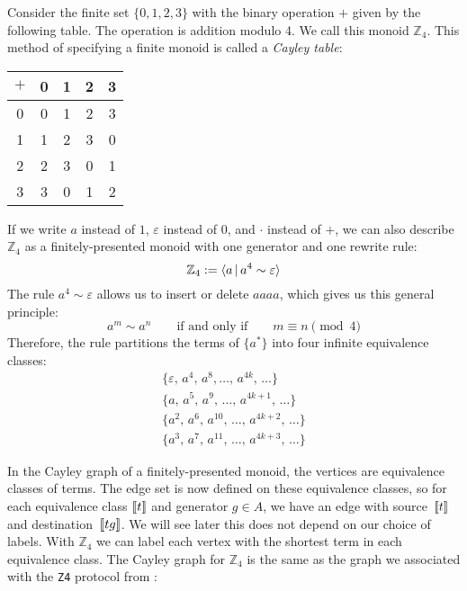 \documentclass[../generics]{subfiles}
\begin{document}
\begin{example}\label{monoid z4 example}
Consider the finite set $\{0,1,2,3\}$ with the binary operation $+$ given by the following table. The operation is addition modulo 4. We call this monoid $\mathbb{Z}_4$. This method of specifying a finite monoid is called a \emph{Cayley table}:
\begin{center}
\begin{tabular}{c|cccc}
$+$&0&1&2&3\\
\hline
0&0&1&2&3\\
1&1&2&3&0\\
2&2&3&0&1\\
3&3&0&1&2
\end{tabular}
\end{center}
If we write $a$ instead of $1$, $\varepsilon$ instead of $0$, and $\cdot$ instead of $+$, we can also describe $\mathbb{Z}_4$ as a finitely-presented monoid with one generator and one rewrite rule:
\[\mathbb{Z}_4 := \langle a\,|\,a^4\sim\varepsilon\rangle\]
The rule $a^4\sim\varepsilon$ allows us to insert or delete $aaaa$, which gives us this general principle:
\[a^m\sim a^n\qquad\text{if and only if}\qquad m\equiv n\pmod 4\]
Therefore, the rule partitions the terms of $\{a^*\}$ into four infinite equivalence classes:
\begin{gather*}
\{\varepsilon,\, a^4,\, a^8, \ldots,\, a^{4k},\, \ldots\}\\
\{a,\, a^5,\, a^9,\, \ldots,\, a^{4k+1},\, \ldots\}\\
\{a^2,\, a^6,\, a^{10},\, \ldots,\, a^{4k+2},\, \ldots\}\\
\{a^3,\, a^7,\, a^{11},\, \ldots,\, a^{4k+3},\, \ldots\}
\end{gather*}

In the Cayley graph of a finitely-presented monoid, the vertices are equivalence classes of terms. The edge set is now defined on these equivalence classes, so for each equivalence class $[\![t]\!]$ and generator $g\in A$, we have an edge with source~$[\![t]\!]$ and destination~$[\![tg]\!]$. We will see later this does not depend on our choice of labels. With $\mathbb{Z}_4$ we can label each vertex with the shortest term in each equivalence class. The Cayley graph for $\mathbb{Z}_4$ is the same as the graph we associated with the \texttt{Z4} protocol from :


\end{example}
\end{document}
